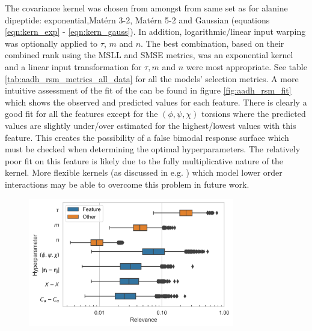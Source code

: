 The covariance kernel was chosen from amongst from same set as for alanine dipeptide: exponential,Mat\'{e}rn 3-2, Mat\'{e}rn 5-2 and  Gaussian (equations \ref{eqn:kern_exp} - \ref{eqn:kern_gauss}). In addition, logarithmic/linear input warping was optionally applied to $\tau$, $m$ and $n$. The best combination, based on their combined rank using the MSLL and SMSE metrics, was an exponential kernel and a linear input transformation for $\tau, m$ and $n$ were most appropriate. See table \ref{tab:aadh_rsm_metrics_all_data} for  all the models' selection metrics. A more intuitive assessment of the fit of the can be found in figure  \ref{fig:aadh_rsm_fit} which shows the observed and predicted values for each feature. There is clearly a good fit for all the features except for the $(\phi, \psi, \chi)$ torsions where the predicted values are slightly under/over estimated for the highest/lowest values with this feature. This creates the possibility of a false bimodal response surface which must be checked when determining the optimal hyperparameters.  The relatively poor fit on this feature is likely due to the fully multiplicative nature of the kernel. More flexible kernels (as discussed in e.g. \cite{duvenaud2011additive}) which model lower order interactions may be able to overcome this problem in future work. 

\begin{figure}
    \centering
    \includegraphics[width=0.8\textwidth]{chapters/msm_optimization/figures/AADH_relevance_d.png}
    \label{fig:aadh_relevance}
\end{figure}


